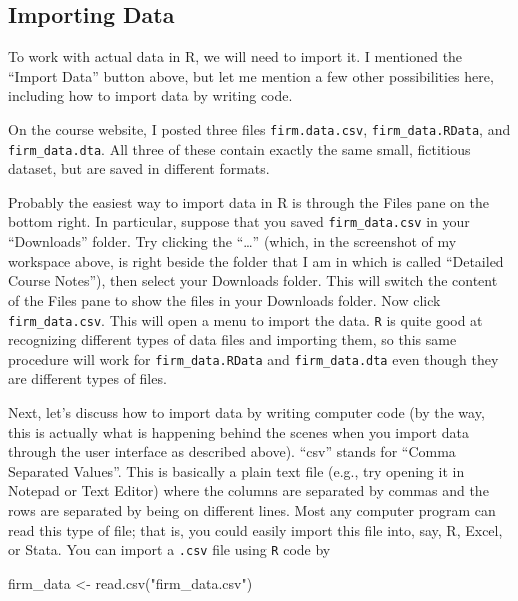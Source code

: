 \documentclass[
  letterpaper,
  DIV=11,
  numbers=noendperiod]{scrreprt}
\newenvironment{Shaded}{\begin{snugshade}}{\end{snugshade}}
\newcommand{\FunctionTok}[1]{\textcolor[rgb]{0.28,0.35,0.67}{#1}}
\newcommand{\NormalTok}[1]{\textcolor[rgb]{0.00,0.23,0.31}{#1}}
\newcommand{\OtherTok}[1]{\textcolor[rgb]{0.00,0.23,0.31}{#1}}
\newcommand{\StringTok}[1]{\textcolor[rgb]{0.13,0.47,0.30}{#1}}
\begin{document}
\subsection{Importing Data}\label{importing-data}

To work with actual data in R, we will need to import it. I mentioned
the ``Import Data'' button above, but let me mention a few other
possibilities here, including how to import data by writing code.

On the course website, I posted three files \texttt{firm.data.csv},
\texttt{firm\_data.RData}, and \texttt{firm\_data.dta}. All three of
these contain exactly the same small, fictitious dataset, but are saved
in different formats.

Probably the easiest way to import data in R is through the Files pane
on the bottom right. In particular, suppose that you saved
\texttt{firm\_data.csv} in your ``Downloads'' folder. Try clicking the
``\ldots{}'' (which, in the screenshot of my workspace above, is right
beside the folder that I am in which is called ``Detailed Course
Notes''), then select your Downloads folder. This will switch the
content of the Files pane to show the files in your Downloads folder.
Now click \texttt{firm\_data.csv}. This will open a menu to import the
data. \texttt{R} is quite good at recognizing different types of data
files and importing them, so this same procedure will work for
\texttt{firm\_data.RData} and \texttt{firm\_data.dta} even though they
are different types of files.

Next, let's discuss how to import data by writing computer code (by the
way, this is actually what is happening behind the scenes when you
import data through the user interface as described above). ``csv''
stands for ``Comma Separated Values''. This is basically a plain text
file (e.g., try opening it in Notepad or Text Editor) where the columns
are separated by commas and the rows are separated by being on different
lines. Most any computer program can read this type of file; that is,
you could easily import this file into, say, R, Excel, or Stata. You can
import a \texttt{.csv} file using \texttt{R} code by

\begin{Shaded}
\begin{Highlighting}[]
\NormalTok{firm\_data }\OtherTok{\textless{}{-}} \FunctionTok{read.csv}\NormalTok{(}\StringTok{"firm\_data.csv"}\NormalTok{)}
\end{Highlighting}
\end{Shaded}
\end{document}

